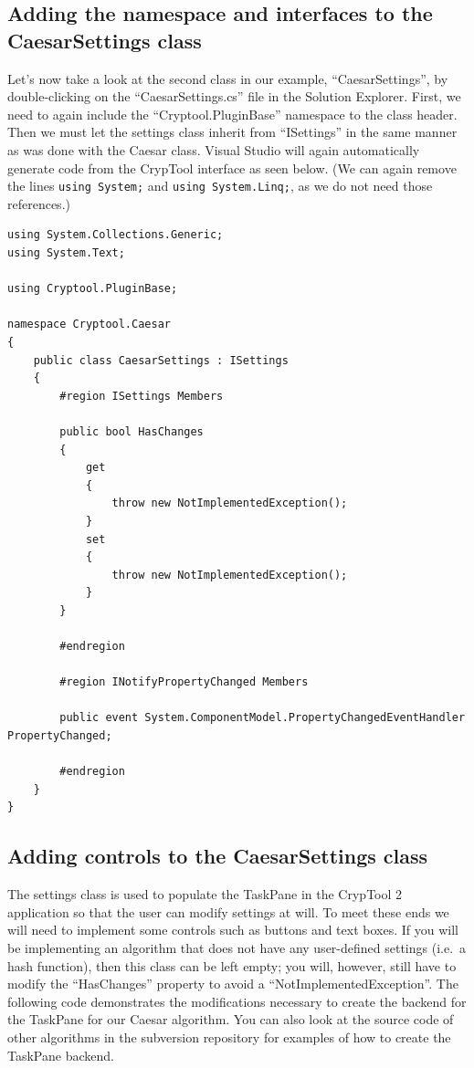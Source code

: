 \subsection{Adding the namespace and interfaces to the CaesarSettings class}
\label{sec:AddingTheNamespaceAndInterfacesToTheCaesarSettingsClass}

Let's now take a look at the second class in our example, ``CaesarSettings'', by double-clicking on the ``CaesarSettings.cs'' file in the Solution Explorer. First, we need to again include the ``Cryptool.PluginBase'' namespace to the class header. Then we must let the settings class inherit from ``ISettings'' in the same manner as was done with the Caesar class. Visual Studio will again automatically generate code from the CrypTool interface as seen below. (We can again remove the lines \texttt{using System;} and \texttt{using System.Linq;}, as we do not need those references.)\\

\begin{lstlisting}
using System.Collections.Generic;
using System.Text;

using Cryptool.PluginBase;

namespace Cryptool.Caesar
{
    public class CaesarSettings : ISettings
    {
        #region ISettings Members

        public bool HasChanges
        {
            get
            {
                throw new NotImplementedException();
            }
            set
            {
                throw new NotImplementedException();
            }
        }

        #endregion

        #region INotifyPropertyChanged Members

        public event System.ComponentModel.PropertyChangedEventHandler PropertyChanged;

        #endregion
    }
}
\end{lstlisting}

\subsection{Adding controls to the CaesarSettings class}
\label{sec:AddingControlsToTheCaesarSettingsClass}

The settings class is used to populate the TaskPane in the CrypTool 2 application so that the user can modify settings at will. To meet these ends we will need to implement some controls such as buttons and text boxes. If you will be implementing an algorithm that does not have any user-defined settings (i.e.\ a hash function), then this class can be left empty; you will, however, still have to modify the ``HasChanges'' property to avoid a ``NotImplementedException''. The following code demonstrates the modifications necessary to create the backend for the TaskPane for our Caesar algorithm. You can also look at the source code of other algorithms in the subversion repository for examples of how to create the TaskPane backend.\\

